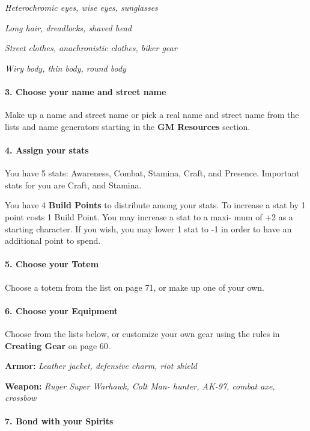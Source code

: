 \begin{multicols}{3}
\textit{Heterochromic eyes, wise eyes, sunglasses}

\textit{Long hair, dreadlocks, shaved head}

\textit{Street clothes, anachronistic clothes, biker gear}

\textit{Wiry body, thin body, round body}

\paragraph{3.  Choose your name and street name}

Make up a name and street name or pick a real
name and street name from the lists and name
generators starting in the \textbf{GM Resources} section.

\paragraph{4.  Assign your stats}

You have 5 stats: Awareness, Combat, Stamina,
Craft, and Presence. Important stats for you are
Craft, and Stamina.

You have 4 \textbf{Build Points} to distribute among
your stats. To increase a stat by 1 point costs 1
Build Point. You may increase a stat to a maxi-
mum of +2 as a starting character. If you wish,
you may lower 1 stat to -1 in order to have an
additional point to spend.

\paragraph{5.  Choose your Totem}

Choose a totem from the list on page 71, or
make up one of your own.

\paragraph{6.  Choose your Equipment}

Choose from the lists below, or customize your
own gear using the rules in \textbf{Creating Gear} on
page 60.

\textbf{Armor:} \textit{Leather jacket, defensive charm, riot
shield}

\textbf{Weapon:} \textit{Ruger Super Warhawk, Colt Man-
hunter, AK-97, combat axe, crossbow}

\paragraph{7.  Bond with your Spirits}


\end{multicols}
